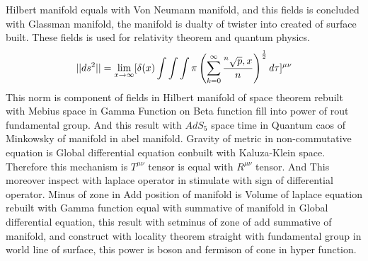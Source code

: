\documentclass{jsarticle}
\begin{document}
{ Hilbert manifold equals with Von Neumann manifold, and this fields is concluded with Glassman manifold,
the manifold is dualty of twister into created of surface built.
These fields is used for relativity theorem and quantum physics.
$$ ||ds^2|| = \lim_{x \to \infty} [\delta(x) \int \int \int \pi \left( \sum_{k=0}^{\infty}
		{{}^n\sqrt{p},x \over n} \right)
^{1 \over 2}d \tau]^{\mu\nu} $$
  This norm is component of fields in Hilbert manifold of space theorem rebuilt with
Mebius space in Gamma Function on Beta function fill into power of rout fundamental
group.
And this result with $AdS_5$ space time in Quantum caos of Minkowsky of manifold in
abel manifold.
Gravity of metric in non-commutative equation is Global differential equation
conbuilt with Kaluza-Klein space. Therefore this mechanism is $T^{\mu\nu}$ tensor
is equal with $R^{\mu\nu}$ tensor. And This moreover inspect with laplace operator
in stimulate with sign of differential operator.
Minus of zone in Add position of manifold is Volume of laplace equation rebuilt with
Gamma function equal with summative of manifold in Global differential equation,
this result with setminus of zone of add summative of manifold, and construct with
locality theorem straight with fundamental group in world line of surface, this
power is boson and fermison of cone in hyper function.

}
\end{document}
